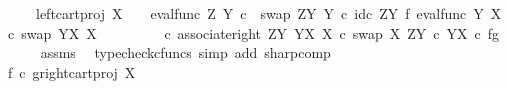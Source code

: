 \begin{isabellebody}
\ \ \ \ \ left{\isacharunderscore}{\kern0pt}cart{\isacharunderscore}{\kern0pt}proj\ X\ {\isasymone}{\isacharparenright}{\kern0pt}\isactrlsup {\isasymsharp}\ {\isacharequal}{\kern0pt}\ \ {\isacharparenleft}{\kern0pt}eval{\isacharunderscore}{\kern0pt}func\ Z\ Y\ {\isasymcirc}\isactrlsub c\ \ swap\ {\isacharparenleft}{\kern0pt}Z\isactrlbsup Y\isactrlesup {\isacharparenright}{\kern0pt}\ Y\ {\isasymcirc}\isactrlsub c\ {\isacharparenleft}{\kern0pt}id\isactrlsub c\ {\isacharparenleft}{\kern0pt}Z\isactrlbsup Y\isactrlesup {\isacharparenright}{\kern0pt}\ {\isasymtimes}\isactrlsub f\ {\isacharparenleft}{\kern0pt}eval{\isacharunderscore}{\kern0pt}func\ Y\ X\ {\isasymcirc}\isactrlsub c\ swap\ {\isacharparenleft}{\kern0pt}Y\isactrlbsup X\isactrlesup {\isacharparenright}{\kern0pt}\ X{\isacharparenright}{\kern0pt}{\isacharparenright}{\kern0pt}\isanewline
\ \ \ \ \ \ \ \ \ {\isasymcirc}\isactrlsub c\ associate{\isacharunderscore}{\kern0pt}right\ {\isacharparenleft}{\kern0pt}Z\isactrlbsup Y\isactrlesup {\isacharparenright}{\kern0pt}\ {\isacharparenleft}{\kern0pt}Y\isactrlbsup X\isactrlesup {\isacharparenright}{\kern0pt}\ X\ {\isasymcirc}\isactrlsub c\ swap\ X\ {\isacharparenleft}{\kern0pt}Z\isactrlbsup Y\isactrlesup \ {\isasymtimes}\isactrlsub c\ Y\isactrlbsup X\isactrlesup {\isacharparenright}{\kern0pt}{\isacharparenright}{\kern0pt}\isactrlsup {\isasymsharp}\ {\isasymcirc}\isactrlsub c\ {\isasymlangle}f{\isacharcomma}{\kern0pt}g{\isasymrangle}{\isachardoublequoteclose}\isanewline
\ \ \ \ \isamarkupfalse%
\ assms\ \isamarkupfalse%
\ {\isacharparenleft}{\kern0pt}typecheck{\isacharunderscore}{\kern0pt}cfuncs{\isacharcomma}{\kern0pt}\ simp\ add{\isacharcolon}{\kern0pt}\ sharp{\isacharunderscore}{\kern0pt}comp{\isacharparenright}{\kern0pt}\ \ \isanewline
\ \ \isamarkupfalse%
\ \isamarkupfalse%
\ {\isachardoublequoteopen}{\isacharparenleft}{\kern0pt}f\isactrlsup {\isasymflat}\ {\isasymcirc}\isactrlsub c\ {\isasymlangle}g\isactrlsup {\isasymflat}{\isacharcomma}{\kern0pt}right{\isacharunderscore}{\kern0pt}cart{\isacharunderscore}{\kern0pt}proj\ X\ {\isasymone}{\isasymrangle}{\isacharparenright}{\kern0pt}\isactrlsup {\isasymsharp}\ {\isacharequal}{\kern0pt}\isanewline

\end{isabellebody}
